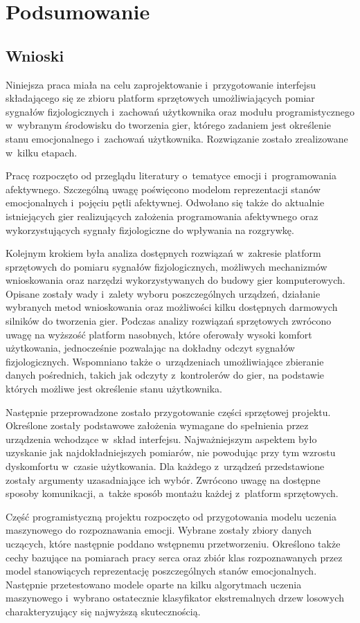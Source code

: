 \chapter{Podsumowanie}
\label{cha:podsumowanie}
\section{Wnioski}
Niniejsza praca miała na celu zaprojektowanie i~przygotowanie interfejsu składającego się ze zbioru platform sprzętowych umożliwiających pomiar sygnałów fizjologicznych i~zachowań użytkownika oraz modułu programistycznego w~wybranym środowisku do tworzenia gier, którego zadaniem jest określenie stanu emocjonalnego i~zachowań użytkownika. Rozwiązanie zostało zrealizowane w~kilku etapach.

Pracę rozpoczęto od przeglądu literatury o~tematyce emocji i~programowania afektywnego. Szczególną uwagę poświęcono modelom reprezentacji stanów emocjonalnych i~pojęciu pętli afektywnej. Odwołano się także do aktualnie istniejących gier realizujących założenia programowania afektywnego oraz wykorzystujących sygnały fizjologiczne do wpływania na rozgrywkę.

Kolejnym krokiem była analiza dostępnych rozwiązań w~zakresie platform sprzętowych do pomiaru sygnałów fizjologicznych, możliwych mechanizmów wnioskowania oraz narzędzi wykorzystywanych do budowy gier komputerowych. Opisane zostały wady i~zalety wyboru poszczególnych urządzeń, działanie wybranych metod wnioskowania oraz możliwości kilku dostępnych darmowych silników do tworzenia gier. Podczas analizy rozwiązań sprzętowych zwrócono uwagę na wyższość platform nasobnych, które oferowały wysoki komfort użytkowania, jednocześnie pozwalając na dokładny odczyt sygnałów fizjologicznych. Wspomniano także o~urządzeniach umożliwiające zbieranie danych pośrednich, takich jak odczyty z~kontrolerów do gier, na podstawie których możliwe jest określenie stanu użytkownika.

Następnie przeprowadzone zostało przygotowanie części sprzętowej projektu. Określone zostały podstawowe założenia wymagane do spełnienia przez urządzenia wchodzące w~skład interfejsu. Najważniejszym aspektem było uzyskanie jak najdokładniejszych pomiarów, nie powodując przy tym wzrostu dyskomfortu w~czasie użytkowania. Dla każdego z~urządzeń przedstawione zostały argumenty uzasadniające ich wybór. Zwrócono uwagę na dostępne sposoby komunikacji, a~także sposób montażu każdej z~platform sprzętowych.

Część programistyczną projektu rozpoczęto od przygotowania modelu uczenia maszynowego do rozpoznawania emocji. Wybrane zostały zbiory danych uczących, które następnie poddano wstępnemu przetworzeniu. Określono także cechy bazujące na pomiarach pracy serca oraz zbiór klas rozpoznawanych przez model stanowiących reprezentację poszczególnych stanów emocjonalnych. Następnie przetestowano modele oparte na kilku algorytmach uczenia maszynowego i~wybrano ostatecznie klasyfikator ekstremalnych drzew losowych charakteryzujący się najwyższą skutecznością.

